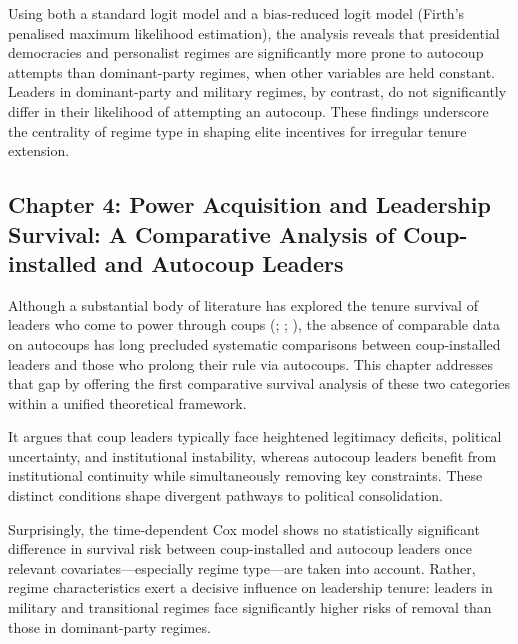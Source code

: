 \documentclass[
  12pt,
]{report}
\begin{document}
Using both a standard logit model and a bias-reduced logit model
(Firth's penalised maximum likelihood estimation), the analysis reveals
that presidential democracies and personalist regimes are significantly
more prone to autocoup attempts than dominant-party regimes, when other
variables are held constant. Leaders in dominant-party and military
regimes, by contrast, do not significantly differ in their likelihood of
attempting an autocoup. These findings underscore the centrality of
regime type in shaping elite incentives for irregular tenure extension.

\subsection*{Chapter 4: Power Acquisition and Leadership Survival: A
Comparative Analysis of Coup-installed and Autocoup
Leaders}\label{chapter-4-power-acquisition-and-leadership-survival-a-comparative-analysis-of-coup-installed-and-autocoup-leaders}

Although a substantial body of literature has explored the tenure
survival of leaders who come to power through coups
(;
;
), the absence of
comparable data on autocoups has long precluded systematic comparisons
between coup-installed leaders and those who prolong their rule via
autocoups. This chapter addresses that gap by offering the first
comparative survival analysis of these two categories within a unified
theoretical framework.

It argues that coup leaders typically face heightened legitimacy
deficits, political uncertainty, and institutional instability, whereas
autocoup leaders benefit from institutional continuity while
simultaneously removing key constraints. These distinct conditions shape
divergent pathways to political consolidation.

Surprisingly, the time-dependent Cox model shows no statistically
significant difference in survival risk between coup-installed and
autocoup leaders once relevant covariates---especially regime type---are
taken into account. Rather, regime characteristics exert a decisive
influence on leadership tenure: leaders in military and transitional
regimes face significantly higher risks of removal than those in
dominant-party regimes.
\end{document}
